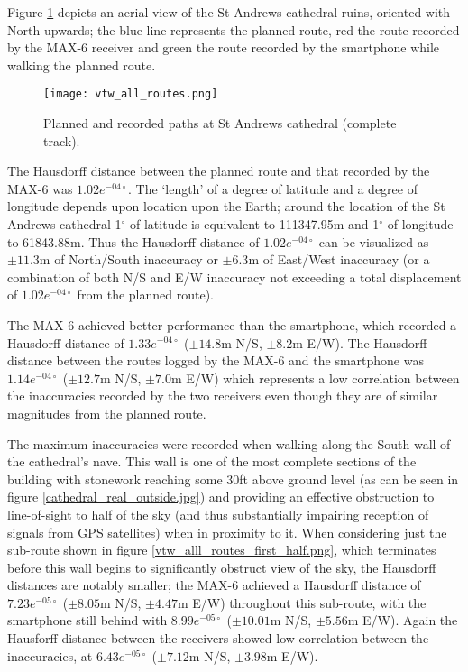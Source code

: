 Figure \ref{vtw_all_routes.png} depicts an aerial view of the St Andrews cathedral ruins, oriented with North upwards; the blue line represents the planned route, red the route recorded by the MAX-6 receiver and green the route recorded by the smartphone while walking the planned route.

\begin{figure}[h]
\centering
\texttt{[image: vtw\_all\_routes.png]}
\caption{Planned and recorded paths at St Andrews cathedral (complete track).}
\label{vtw_all_routes.png}
\end{figure}

The Hausdorff distance between the planned route and that recorded by the MAX-6 was $1.02e^{-04\circ}$. The `length' of a degree of latitude and a degree of longitude depends upon location upon the Earth; around the location of the St Andrews cathedral 1$^\circ$ of latitude is equivalent to 111347.95m and 1$^\circ$ of longitude to 61843.88m. Thus the Hausdorff distance of $1.02e^{-04\circ}$ can be visualized as $\pm11.3$m of North/South inaccuracy or $\pm6.3$m of East/West inaccuracy (or a combination of both N/S and E/W inaccuracy not exceeding a total displacement of $1.02e^{-04\circ}$ from the planned route).

The MAX-6 achieved better performance than the smartphone, which recorded a Hausdorff distance of $1.33e^{-04\circ}$ ($\pm14.8$m N/S, $\pm8.2$m E/W). The Hausdorff distance between the routes logged by the MAX-6 and the smartphone was $1.14e^{-04\circ}$ ($\pm12.7$m N/S, $\pm7.0$m E/W) which represents a low correlation between the inaccuracies recorded by the two receivers even though they are of similar magnitudes from the planned route.

The maximum inaccuracies were recorded when walking along the South wall of the cathedral's nave. This wall is one of the most complete sections of the building with stonework reaching some 30ft above ground level (as can be seen in figure \ref{cathedral_real_outside.jpg}) and providing an effective obstruction to line-of-sight to half of the sky (and thus substantially impairing reception of signals from GPS satellites) when in proximity to it. When considering just the sub-route shown in figure \ref{vtw_alll_routes_first_half.png}, which terminates before this wall begins to significantly obstruct view of the sky, the Hausdorff distances are notably smaller; the MAX-6 achieved a Hausdorff distance of $7.23e^{-05\circ}$ ($\pm8.05$m N/S, $\pm4.47$m E/W) throughout this sub-route, with the smartphone still behind with $8.99e^{-05\circ}$ ($\pm10.01$m N/S, $\pm5.56$m E/W). Again the Hausforff distance between the receivers showed low correlation between the inaccuracies, at $6.43e^{-05\circ}$ ($\pm7.12$m N/S, $\pm3.98$m E/W).
 
